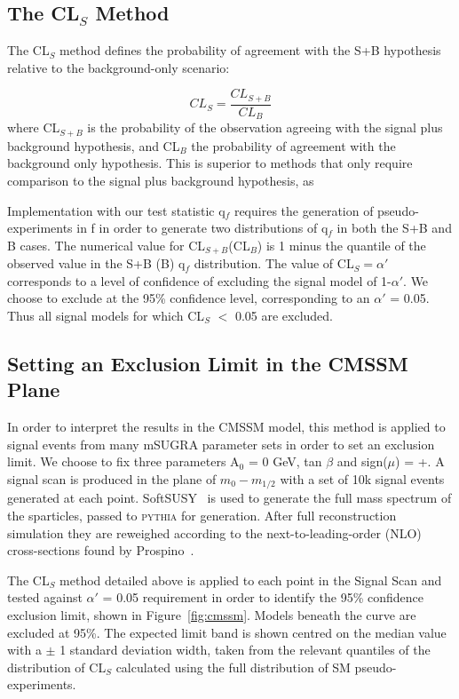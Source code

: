 \subsection{The CL$_{S}$ Method}

The CL$_{S}$ method defines the probability of agreement with the S+B hypothesis relative to the background-only scenario:

\begin{equation}
CL_{S} = \frac{CL_{S+B}}{CL_{B}}
\label{eq:cls}
\end{equation} 
 where CL$_{S+B}$ is the probability of the observation agreeing with the signal plus background hypothesis, and CL$_{B}$ the probability of agreement with the background only hypothesis. This is superior to methods that only require comparison to the signal plus background hypothesis, as 
 
 Implementation with our test statistic q$_{f}$ requires the generation of pseudo-experiments in f in order to generate two distributions of q$_{f}$ in both the S+B and B cases. The numerical value for CL$_{S+B}$(CL$_{B}$) is 1 minus the quantile of the observed value in the S+B (B) q$_{f}$ distribution. The value of CL$_{S} = \alpha'$ corresponds to a level of confidence of excluding the signal model of 1-$\alpha'$. We choose to exclude at the 95\% confidence level, corresponding to an $\alpha'$ = 0.05. Thus all signal models for which CL$_{S}$ $<$ 0.05 are excluded. 
 
\subsection{Setting an Exclusion Limit in the CMSSM Plane}
 
In order to interpret the results in the CMSSM model, this method is applied to signal events from many mSUGRA parameter sets in order to set an exclusion limit. We choose to fix three parameters A$_{0}$ = 0 GeV, tan $\beta$ and sign($\mu$) = +. A signal scan is produced in the plane of $m_{0} - m_{1/2}$ with a set of 10k signal events generated at each point. SoftSUSY~\cite{softsusy} is used to generate the full mass spectrum of the sparticles, passed to \textsc{pythia} for generation. After full reconstruction simulation they are reweighed according to the next-to-leading-order (NLO) cross-sections found by Prospino~\cite{prospino}. 

The CL$_{S}$ method detailed above is applied to each point in the Signal Scan and tested against $\alpha'$ = 0.05 requirement in order to identify the 95\% confidence exclusion limit, shown in Figure~\ref{fig:cmssm}. Models beneath the  curve are excluded at 95\%. The expected limit band is shown centred on the median value with a $\pm$ 1 standard deviation width, taken from the relevant quantiles of the distribution of CL$_{S}$ calculated using the full distribution of SM pseudo-experiments. 

